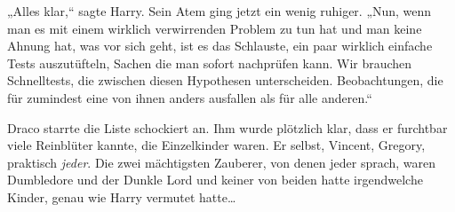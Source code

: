 „Alles klar,“ sagte Harry. Sein Atem ging jetzt ein wenig ruhiger. „Nun, wenn man es mit einem wirklich verwirrenden Problem zu tun hat und man keine Ahnung hat, was vor sich geht, ist es das Schlauste, ein paar wirklich einfache Tests auszutüfteln, Sachen die man sofort nachprüfen kann. Wir brauchen Schnelltests, die zwischen diesen Hypothesen unterscheiden. Beobachtungen, die für zumindest eine von ihnen anders ausfallen als für alle anderen.“

Draco starrte die Liste schockiert an. Ihm wurde plötzlich klar, dass er furchtbar viele Reinblüter kannte, die Einzelkinder waren. Er selbst, Vincent, Gregory, praktisch \emph{jeder}. Die zwei mächtigsten Zauberer, von denen jeder sprach, waren Dumbledore und der Dunkle Lord und keiner von beiden hatte irgendwelche Kinder, genau wie Harry vermutet hatte…

